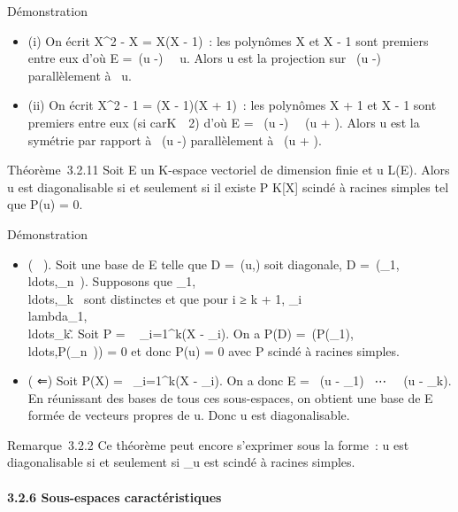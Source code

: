 \documentclass[]{article}
\begin{document}
Démonstration

\begin{itemize}
\itemsep1pt\parskip0pt
\item
  (i) On écrit X^2 - X = X(X - 1)~: les polynômes X et X - 1
  sont premiers entre eux d'où E =\
  \mathrmKer(u -\mathrmId)
  \oplus~\mathrmKer~u. Alors u est
  la projection sur
  \mathrmKer~(u
  -\mathrmId) parallèlement à
  \mathrmKer~u.
\item
  (ii) On écrit X^2 - 1 = (X - 1)(X + 1)~: les polynômes X +
  1 et X - 1 sont premiers entre eux (si
  carK\mathrel\neq~~2) d'où E
  = \mathrmKer~(u
  -\mathrmId)
  \oplus~\mathrmKer~(u +
  \mathrmId). Alors u est la symétrie par rapport à
  \mathrmKer~(u
  -\mathrmId) parallèlement à
  \mathrmKer~(u +
  \mathrmId).
\end{itemize}

Théorème~3.2.11 Soit E un K-espace vectoriel de dimension finie et u \in
L(E). Alors u est diagonalisable si et seulement si il existe P \in
K[X] scindé à racines simples tel que P(u) = 0.

Démonstration

\begin{itemize}
\itemsep1pt\parskip0pt
\item
  ( \rigtharrow~). Soit  une base de E telle que D =\
  \mathrmMat (u,) soit diagonale, D
  =\
  \mathrmdiag(\lambda_1,\\ldots,\lambda_n~).
  Supposons que
  \lambda_1,\\ldots,\lambda_k~
  sont distinctes et que pour i ≥ k + 1, \lambda_i
  \in\\lambda_1,\\ldots\lambda_k\~.
  Soit P = \∏ ~
  _i=1^k(X - \lambda_i). On a P(D)
  =\
  \mathrmdiag(P(\lambda_1),\\ldots,P(\lambda_n~))
  = 0 et donc P(u) = 0 avec P scindé à racines simples.
\item
  ( ⇐) Soit P(X) =\ \∏
   _i=1^k(X - \lambda_i). On a donc E
  = \mathrmKer~(u -
  \lambda_1\mathrmId)
  \oplus~⋯
  \oplus~\mathrmKer~(u -
  \lambda_k\mathrmId). En réunissant des bases de
  tous ces sous-espaces, on obtient une base de E formée de vecteurs
  propres de u. Donc u est diagonalisable.
\end{itemize}

Remarque~3.2.2 Ce théorème peut encore s'exprimer sous la forme~: u est
diagonalisable si et seulement si \mu_u est scindé à racines
simples.

\paragraph{3.2.6 Sous-espaces caractéristiques}
\end{document}
